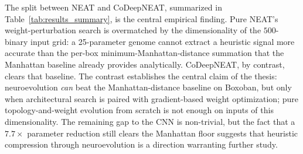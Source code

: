 The split between NEAT and CoDeepNEAT, summarized in Table~\ref{tab:results_summary}, is the central empirical finding. Pure NEAT's weight-perturbation search is overmatched by the dimensionality of the $500$-binary input grid: a 25-parameter genome cannot extract a heuristic signal more accurate than the per-box minimum-Manhattan-distance summation that the Manhattan baseline already provides analytically. CoDeepNEAT, by contrast, clears that baseline. The contrast establishes the central claim of the thesis: neuroevolution \emph{can} beat the Manhattan-distance baseline on Boxoban, but only when architectural search is paired with gradient-based weight optimization; pure topology-and-weight evolution from scratch is not enough on inputs of this dimensionality. The remaining gap to the CNN is non-trivial, but the fact that a $7.7\times$ parameter reduction still clears the Manhattan floor suggests that heuristic compression through neuroevolution is a direction warranting further study.
